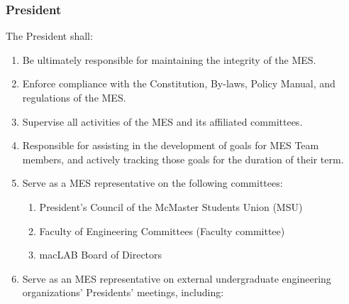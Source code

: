 \subsubsection{President}
\label{president}

The President shall:

\begin{enumerate}
 \item
  Be ultimately responsible for maintaining the integrity of the MES.
 \item
  Enforce compliance with the Constitution, By-laws, Policy Manual, and regulations of the MES.
 \item
  Supervise all activities of the MES and its affiliated committees.
 \item
  Responsible for assisting in the development of goals for MES Team members, and actively tracking those goals for the duration of their term.
 \item
  Serve as a MES representative on the following committees:

  \begin{enumerate}
   \item
    President's Council of the McMaster Students Union (MSU)
   \item
    Faculty of Engineering Committees (Faculty committee)
   \item
    macLAB Board of Directors
  \end{enumerate}
 \item
  Serve as an MES representative on external undergraduate engineering organizations' Presidents' meetings, including:


\end{enumerate}
